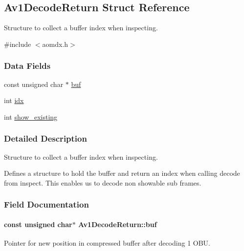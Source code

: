 \hypertarget{structAv1DecodeReturn}{}\subsection{Av1\+Decode\+Return Struct Reference}
\label{structAv1DecodeReturn}


Structure to collect a buffer index when inspecting.  




{\ttfamily \#include $<$aomdx.\+h$>$}

\subsubsection*{Data Fields}
\begin{DoxyCompactItemize}
\item 
const unsigned char $\ast$ \hyperlink{structAv1DecodeReturn_aab2b7d54d778b8d5ef5b475b4460ee9f}{buf}
\item 
int \hyperlink{structAv1DecodeReturn_aeefcb8b1f412902428fa86ea066e4414}{idx}
\item 
int \hyperlink{structAv1DecodeReturn_ac95f1cc492f7bb172dc1d9132674c3ec}{show\+\_\+existing}
\end{DoxyCompactItemize}


\subsubsection{Detailed Description}
Structure to collect a buffer index when inspecting. 

Defines a structure to hold the buffer and return an index when calling decode from inspect. This enables us to decode non showable sub frames. 

\subsubsection{Field Documentation}
\paragraph[{\texorpdfstring{buf}{buf}}]{\setlength{\rightskip}{0pt plus 5cm}const unsigned char$\ast$ Av1\+Decode\+Return\+::buf}\hypertarget{structAv1DecodeReturn_aab2b7d54d778b8d5ef5b475b4460ee9f}{}\label{structAv1DecodeReturn_aab2b7d54d778b8d5ef5b475b4460ee9f}
Pointer for new position in compressed buffer after decoding 1 O\+BU. 
